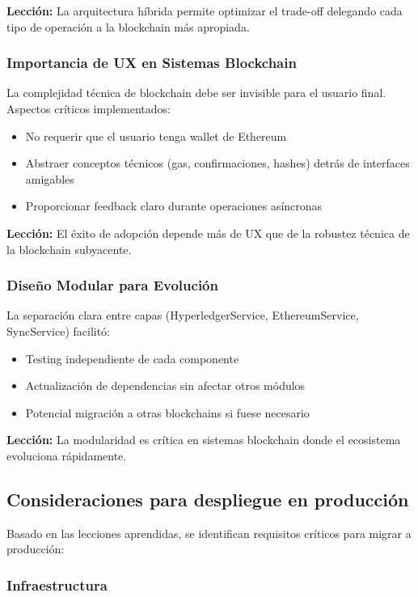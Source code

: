 \textbf{Lección:} La arquitectura híbrida permite optimizar el trade-off delegando cada tipo de operación a la blockchain más apropiada.

\subsubsection{Importancia de UX en Sistemas Blockchain}

La complejidad técnica de blockchain debe ser invisible para el usuario final. Aspectos críticos implementados:
\begin{itemize}
    \item No requerir que el usuario tenga wallet de Ethereum
    \item Abstraer conceptos técnicos (gas, confirmaciones, hashes) detrás de interfaces amigables
    \item Proporcionar feedback claro durante operaciones asíncronas
\end{itemize}

\textbf{Lección:} El éxito de adopción depende más de UX que de la robustez técnica de la blockchain subyacente.

\subsubsection{Diseño Modular para Evolución}

La separación clara entre capas (HyperledgerService, EthereumService, SyncService) facilitó:
\begin{itemize}
    \item Testing independiente de cada componente
    \item Actualización de dependencias sin afectar otros módulos
    \item Potencial migración a otras blockchains si fuese necesario
\end{itemize}

\textbf{Lección:} La modularidad es crítica en sistemas blockchain donde el ecosistema evoluciona rápidamente.

\subsection{Consideraciones para despliegue en producción}

Basado en las lecciones aprendidas, se identifican requisitos críticos para migrar a producción:

\subsubsection{Infraestructura}


